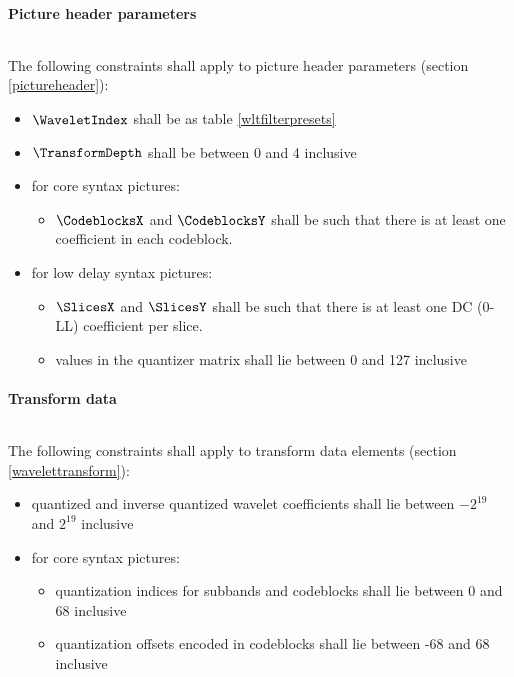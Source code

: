 \paragraph{Picture header parameters}$\ $\newline

The following constraints shall apply to picture header parameters
(section \ref{pictureheader}):
\begin{itemize}
\item $\WaveletIndex$ shall be as table \ref{wltfilterpresets}
\item $\TransformDepth$ shall be between 0 and 4 inclusive
\item for core syntax pictures:
    \begin{itemize}
    \item $\CodeblocksX$ and $\CodeblocksY$ shall be such that there is 
    at least one coefficient in each codeblock.
    \end{itemize}
\item for low delay syntax pictures:
    \begin{itemize}
    \item $\SlicesX$ and $\SlicesY$ shall be such that there is at least one 
    DC (0-LL) coefficient per slice.
    \item values in the quantizer matrix shall lie between 0 and 127 inclusive
    \end{itemize}
\end{itemize}

\paragraph{Transform data}$\ $\newline

The following constraints shall apply to transform data elements 
(section \ref{wavelettransform}):
\begin{itemize}
\item quantized and inverse quantized wavelet coefficients shall lie 
between $-2^{19}$ and $2^{19}$ inclusive
\item for core syntax pictures:
    \begin{itemize}
    \item quantization indices for subbands and codeblocks shall lie between 
    0 and 68 inclusive 
    \item quantization offsets encoded in codeblocks shall lie between 
    -68 and 68 inclusive
    \end{itemize} 
\end{itemize} 

